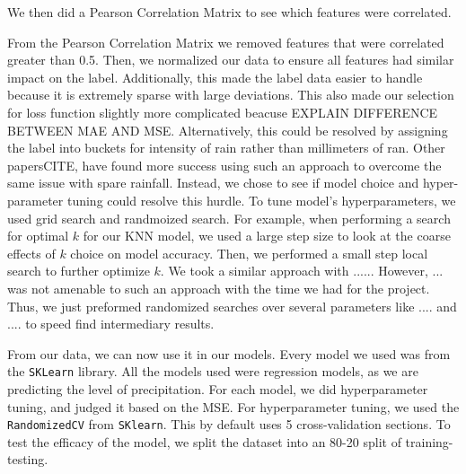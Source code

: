 \documentclass[../report.tex]{subfiles}
\begin{document}
We then did a Pearson Correlation Matrix to see which features were correlated.
\begin{figure}[!ht]
    \centering

    \label{fig:pearson_corr}
\end{figure}
From the Pearson Correlation Matrix we removed features that were correlated greater than 0.5.
Then, we normalized our data to ensure all features had similar impact on the label. 
Additionally, this made the label data easier to handle because it is extremely sparse with large deviations. 
This also made our selection for loss function slightly more complicated beacuse EXPLAIN DIFFERENCE BETWEEN MAE AND MSE. 
Alternatively, this could be resolved by assigning the label into buckets for intensity of rain rather than millimeters of ran. 
Other papersCITE, have found more success using such an approach to overcome the same issue with spare rainfall. 
Instead, we chose to see if model choice and hyper-parameter tuning could resolve this hurdle. 
To tune model's hyperparameters, we used grid search and randmoized search. 
For example, when performing a search for optimal $k$ for our KNN model, we used a large step size to look at the coarse effects of $k$ choice on model accuracy. 
Then, we performed a small step local search to further optimize $k$. 
We took a similar approach with ......
However, ... was not amenable to such an approach with the time we had for the project. 
Thus, we just preformed randomized searches over several parameters like .... and .... to speed find intermediary results.

From our data, we can now use it in our models.
Every model we used was from the \verb|SKLearn| library.
All the models used were regression models, as we are predicting the level of precipitation.
For each model, we did hyperparameter tuning, and judged it based on the MSE.
For hyperparameter tuning, we used the \verb|RandomizedCV| from \verb|SKlearn|.
This by default uses 5 cross-validation sections.
To test the efficacy of the model, we split the dataset into an 80-20 split of training-testing.
\end{document}
